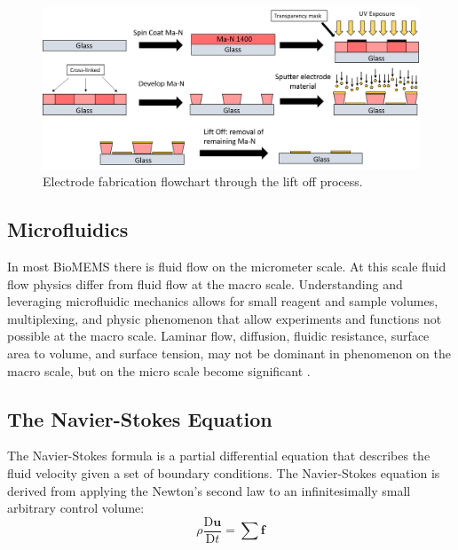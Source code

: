  \begin{figure}
     \centering
     \includegraphics[width=\textwidth]{images/electrodeFabrication.png}
     \caption{Electrode fabrication flowchart through the lift off process.}
     \label{fig:lift_off}
 \end{figure}
 
 
 \subsection{Microfluidics}
 
\par In most BioMEMS there is fluid flow on the micrometer scale. At this scale fluid flow physics differ from fluid flow at the macro scale. Understanding and leveraging microfluidic mechanics allows for small reagent and sample volumes, multiplexing, and physic phenomenon that allow experiments and functions not possible at the macro scale. Laminar flow, diffusion, fluidic resistance, surface area to volume, and surface tension, may not be dominant in phenomenon on the macro scale, but on the micro scale become significant \cite{david_j._beebe_physics_2002}. 

\subsection*{The Navier-Stokes Equation}

\par The Navier-Stokes formula is a partial differential equation that describes the fluid velocity given a set of boundary conditions. The Navier-Stokes equation is derived from applying the Newton's second law to an infinitesimally small arbitrary control volume:
\begin{equation}
    \rho \frac{\text{D}\textbf{u}}{\text{D}t} = \sum \textbf{f}
    \label{eqn:cons_momentum}
\end{equation}

